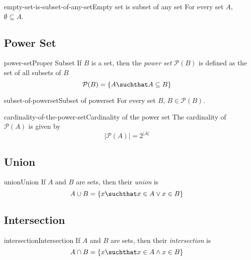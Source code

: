 \documentclass[preview]{standalone}
\begin{document}
\begin{snippetcorollary}{empty-set-is-subset-of-any-set}{Empty set is subset of any set}{
    For every set \(A\),
    \(\emptyset \subseteq A\).
}
\end{snippetcorollary}

\subsection{Power Set}

\begin{snippetdefinition}{power-set}{Proper Subset}{
    If \(B\) is a set, then the \textit{power set} \(\mathcal{P}(B)\)
    is defined as the set of all subsets of \(B\)
    \[
        \mathcal{P}(B)=\{A \suchthat A\subseteq B\}
    \]
}
\end{snippetdefinition}

\begin{snippetcorollary}{subset-of-powerset}{Subset of powerset}{
    For every set \(B\), \(B\in\mathcal{P}(B)\).
}
\end{snippetcorollary}

\begin{snippettheorem}{cardinality-of-the-power-set}{Cardinality of the power set}{
    The cardinality of \(\mathcal{P}(A)\) is given by
    \[
        |\mathcal{P}(A)| = 2^{|A|}
    \]
}
\end{snippettheorem}

\subsection{Union}

\begin{snippetdefinition}{union}{Union}{
    If \(A\) and \(B\) are sets, then their \textit{union} is
    \[
        A \cup B = \{x \suchthat x \in A \lor x \in B\}
    \]
}
\end{snippetdefinition}

\subsection{Intersection}

\begin{snippetdefinition}{intersection}{Intersection}{
    If \(A\) and \(B\) are sets, then their \textit{intersection} is
    \[
        A \cap B = \{x \suchthat x \in A \land x \in B\}
    \]
}
\end{snippetdefinition}
\end{document}
